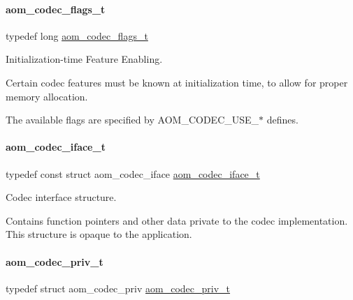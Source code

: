 \paragraph{\texorpdfstring{aom\+\_\+codec\+\_\+flags\+\_\+t}{aom\_codec\_flags\_t}}
{\footnotesize\ttfamily typedef long \hyperlink{group__codec_ga18f2242c1afca329581fbd3f2c81721b}{aom\+\_\+codec\+\_\+flags\+\_\+t}}



Initialization-\/time Feature Enabling. 

Certain codec features must be known at initialization time, to allow for proper memory allocation.

The available flags are specified by A\+O\+M\+\_\+\+C\+O\+D\+E\+C\+\_\+\+U\+S\+E\+\_\+$\ast$ defines. \mbox{\label{group__codec_ga4ef55b44c762836d1550e11921bed403}} 
\paragraph{\texorpdfstring{aom\+\_\+codec\+\_\+iface\+\_\+t}{aom\_codec\_iface\_t}}
{\footnotesize\ttfamily typedef const struct aom\+\_\+codec\+\_\+iface \hyperlink{group__codec_ga4ef55b44c762836d1550e11921bed403}{aom\+\_\+codec\+\_\+iface\+\_\+t}}



Codec interface structure. 

Contains function pointers and other data private to the codec implementation. This structure is opaque to the application. \mbox{\label{group__codec_ga3671963ca4b3d6c2adbc186c8ed18023}} 
\paragraph{\texorpdfstring{aom\+\_\+codec\+\_\+priv\+\_\+t}{aom\_codec\_priv\_t}}
{\footnotesize\ttfamily typedef struct aom\+\_\+codec\+\_\+priv \hyperlink{group__codec_ga3671963ca4b3d6c2adbc186c8ed18023}{aom\+\_\+codec\+\_\+priv\+\_\+t}}



